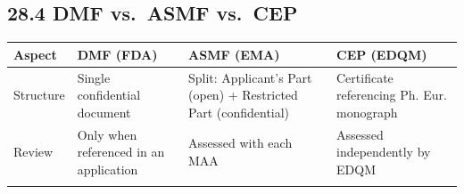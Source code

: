 \documentclass[
  11pt,
  a4paper,
]{report}
\begin{document}
\hypertarget{dmf-vs.-asmf-vs.-cep}{%
\subsection{28.4 DMF vs.~ASMF vs.~CEP}\label{dmf-vs.-asmf-vs.-cep}}

\begin{longtable}[]{@{}llll@{}}
\toprule
\begin{minipage}[b]{0.17\columnwidth}\raggedright
Aspect\strut
\end{minipage} & \begin{minipage}[b]{0.24\columnwidth}\raggedright
DMF (FDA)\strut
\end{minipage} & \begin{minipage}[b]{0.24\columnwidth}\raggedright
ASMF (EMA)\strut
\end{minipage} & \begin{minipage}[b]{0.24\columnwidth}\raggedright
CEP (EDQM)\strut
\end{minipage}\tabularnewline
\midrule
\endhead
\begin{minipage}[t]{0.17\columnwidth}\raggedright
Structure\strut
\end{minipage} & \begin{minipage}[t]{0.24\columnwidth}\raggedright
Single confidential document\strut
\end{minipage} & \begin{minipage}[t]{0.24\columnwidth}\raggedright
Split: Applicant's Part (open) + Restricted Part (confidential)\strut
\end{minipage} & \begin{minipage}[t]{0.24\columnwidth}\raggedright
Certificate referencing Ph. Eur. monograph\strut
\end{minipage}\tabularnewline
\begin{minipage}[t]{0.17\columnwidth}\raggedright
Review\strut
\end{minipage} & \begin{minipage}[t]{0.24\columnwidth}\raggedright
Only when referenced in an application\strut
\end{minipage} & \begin{minipage}[t]{0.24\columnwidth}\raggedright
Assessed with each MAA\strut
\end{minipage} & \begin{minipage}[t]{0.24\columnwidth}\raggedright
Assessed independently by EDQM\strut
\end{minipage}\tabularnewline
\begin{minipage}[t]{0.17\columnwidth}\raggedright

\end{minipage}
\end{longtable}
\end{document}
